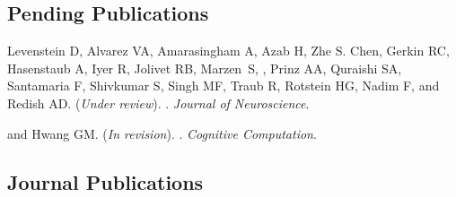 \subsection*{Pending Publications}

\begin{description}
  \item Levenstein D, Alvarez VA, Amarasingham A, Azab H, Zhe S. Chen, Gerkin
    RC, Hasenstaub A, Iyer R, Jolivet RB, Marzen~S, , Prinz AA,
    Quraishi SA, Santamaria F, Shivkumar S, Singh MF, Traub R, Rotstein HG, Nadim
    F, and Redish AD. (\emph{\color{lightred}Under review}). . \emph{Journal of Neuroscience}.
  \item {} and Hwang GM. (\emph{\color{lightred}In revision}).
      . \emph{Cognitive Computation}.
\end{description}

\subsection*{Journal Publications}

